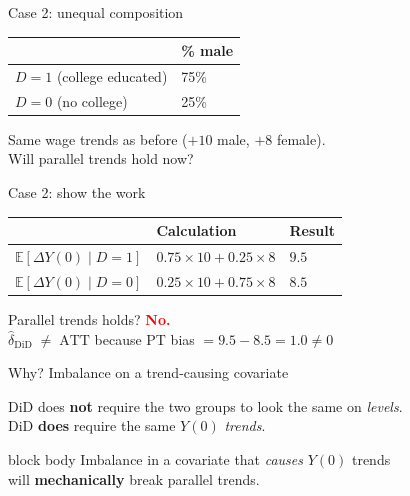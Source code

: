 \documentclass[aspectratio=169,11pt]{beamer}
\newcommand{\emphbox}[1]{%
  \begin{beamercolorbox}[rounded=true,sep=7pt,wd=\linewidth]{block body}%
    \small\color{slate} #1%
  \end{beamercolorbox}}
\begin{document}
\begin{frame}{Case 2: unequal composition}
\vspace{0.5em}
\begin{center}
\begin{tabular}{@{}ll@{}}
\toprule
& \textbf{\% male} \\
\midrule
$D{=}1$ (college educated) & 75\% \\
$D{=}0$ (no college)       & 25\% \\
\bottomrule
\end{tabular}
\end{center}
\vspace{0.8em}
\begin{center}
\color{warmgray}\small
Same wage trends as before ($+10$ male, $+8$ female).\\
Will parallel trends hold now?
\end{center}
\end{frame}

\begin{frame}{Case 2: show the work}
\vspace{0.6em}
\begin{center}
\begin{tabular}{@{}lll@{}}
\toprule
& \textbf{Calculation} & \textbf{Result} \\
\midrule
$\mathbb{E}[\Delta Y(0)\mid D{=}1]$ & $0.75\times10 + 0.25\times8$ & $9.5$ \\[0.3em]
$\mathbb{E}[\Delta Y(0)\mid D{=}0]$ & $0.25\times10 + 0.75\times8$ & $8.5$ \\
\bottomrule
\end{tabular}
\end{center}
\vspace{0.8em}
\begin{center}
Parallel trends holds? \quad \textcolor{red}{\textbf{No.}}\\[0.3em]
\color{warmgray}\small
$\widehat{\delta}_{\text{DiD}} \;\neq\; \text{ATT}$
\quad because PT bias $= 9.5 - 8.5 = 1.0 \neq 0$
\end{center}
\end{frame}

\begin{frame}{Why? Imbalance on a trend-causing covariate}
\vspace{0.8em}
\begin{center}
DiD does \textbf{not} require the two groups to look the same on \emph{levels}.\\[0.6em]
DiD \textbf{does} require the same $Y(0)$ \emph{trends}.\\[0.8em]
\end{center}
\emphbox{Imbalance in a covariate that \emph{causes} $Y(0)$ trends\\
will \textbf{mechanically} break parallel trends.}
\end{frame}
\end{document}
